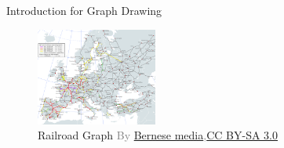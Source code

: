 \documentclass[13pt,aspectratio=169,table,dvipdfmx]{beamer}
\newcommand{\gray}[1]{\textcolor{gray}{#1}}
\begin{document}
\begin{frame}{Introduction for Graph Drawing}
\begin{figure}[htbp]
\begin{minipage}{0.49\columnwidth}
            \caption*{
                Social Network Graph\quad
                \gray{\footnotesize{Designed by \href{www.freepik.com}{Freepik}}}
            }
        \end{minipage}
        \begin{minipage}{0.49\columnwidth}
            \centering
            \includegraphics[height=32mm]{imgs/graph_railway.png}
            \caption*{
                Railroad Graph\quad
                \gray{\footnotesize{By \href{https://commons.wikimedia.org/wiki/File:High_Speed_Railroad_Map_of_Europe.svg}{Bernese media},\href{https://creativecommons.org/licenses/by-sa/3.0}{CC BY-SA 3.0}}}
            }
        \end{minipage}
    \end{figure}
\end{frame}
\end{document}
